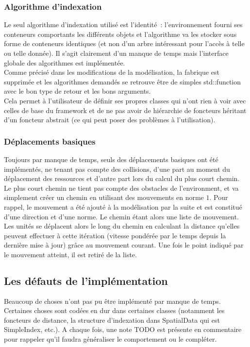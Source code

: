 \subsubsection{Algorithme d'indexation}

Le seul algorithme d'indexation utilisé est l'identité~: l'environnement fourni ses conteneurs comportants les différents objets et l'algorithme va les stocker sous forme de conteneurs identiques (et non d'un arbre intéressant pour l'accès à telle ou telle donnée). Il s'agit clairement d'un manque de temps mais l'interface globale des algorithmes est implémentée.\\

Comme précisé dans les modifications de la modélisation, la fabrique est supprimée et les algorithmes demandés se retrouve être de simples std::function avec le bon type de retour et les bons arguments.\\

Cela permet à l'utilisateur de définir ses propres classes qui n'ont rien à voir avec celles de base du framework et de ne pas avoir de hiérarchie de foncteurs héritant d'un foncteur abstrait (ce qui peut poser des problèmes à l'utilisation).

\subsubsection{Déplacements basiques}

Toujours par manque de temps, seuls des déplacements basiques ont été implémentés, ne tenant pas compte des collisions, d'une part au moment du déplacement des ressources et d'autre part lors du calcul du plus court chemin.\\

Le plus court chemin ne tient pas compte des obstacles de l'environment, et va simplement créer un chemin en utilisant des mouvements en norme $1$. Pour rappel, le mouvement a été ajouté à la modélisation par la suite et est constitué d'une direction et d'une norme. Le chemin étant alors une liste de mouvement.\\

Les unités se déplacent alors le long du chemin en calculant la distance qu'elles peuvent effectuer à cette itération (vitesse pondérée par le temps depuis la dernière mise à jour) grâce au mouvement courant. Une fois le point indiqué par le mouvement atteint, il est retiré de la liste.


\subsection{Les défauts de l'implémentation}
Beaucoup de choses n'ont pas pu être implémenté par manque de temps. \\
Certaines choses sont codées en \og dur \fg{} dans certaines classes (notamment les foncteurs de distance, la structure d'indexation dans SpatialData qui est SimpleIndex, etc.). A chaque fois, une note TODO est présente en commentaire pour rappeler qu'il faudra généraliser le comportement ou le compléter.\\

